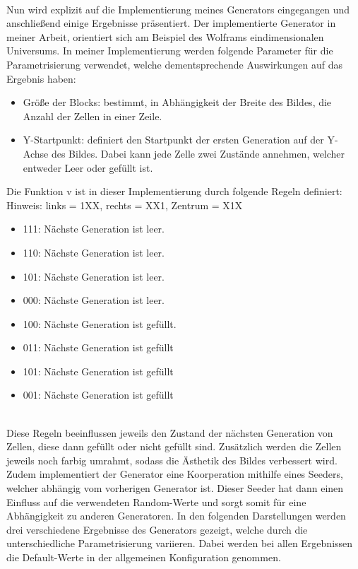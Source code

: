 \documentclass[../mciAusarbeitung.tex]{subfiles}
\begin{document}
            $~$ \\Nun wird explizit auf die Implementierung meines Generators eingegangen und anschließend einige Ergebnisse präsentiert. 
            Der implementierte Generator in meiner Arbeit, orientiert sich am Beispiel des Wolframs eindimensionalen Universums. In meiner Implementierung werden folgende Parameter für die Parametrisierung verwendet, welche dementsprechende Auswirkungen auf das Ergebnis haben:
            \begin{itemize}
            
            \item Größe der Blocks:	bestimmt, in Abhängigkeit der Breite des Bildes, die Anzahl der Zellen in einer Zeile.
            \item Y-Startpunkt:	definiert den Startpunkt der ersten Generation auf der Y-Achse des Bildes.
            Dabei kann jede Zelle zwei Zustände annehmen, welcher entweder Leer oder gefüllt ist. 
            \end{itemize}
            Die Funktion v ist in dieser Implementierung durch folgende Regeln definiert: 
            Hinweis: links = 1XX, rechts = XX1, Zentrum = X1X
            
            \begin{itemize}
 \item 111: Nächste Generation ist leer.
 \item 110: Nächste Generation ist leer.
 \item 101: Nächste Generation ist leer.
 \item 000: Nächste Generation ist leer.
 \item 100: Nächste Generation ist gefüllt.
 \item 011: Nächste Generation ist gefüllt
 \item 101: Nächste Generation ist gefüllt
  \item 001: Nächste Generation ist gefüllt
\end{itemize}

            $~$ \\Diese Regeln beeinflussen jeweils den Zustand der nächsten Generation von Zellen, diese dann gefüllt oder nicht gefüllt sind.  Zusätzlich werden die Zellen jeweils noch farbig umrahmt, sodass die Ästhetik des Bildes verbessert wird. Zudem implementiert der Generator eine Koorperation mithilfe eines Seeders, welcher abhängig vom vorherigen Generator ist. Dieser Seeder hat dann einen Einfluss auf die verwendeten Random-Werte und sorgt somit für eine Abhängigkeit zu anderen Generatoren.
            In den folgenden Darstellungen werden drei verschiedene Ergebnisse des Generators gezeigt, welche durch die unterschiedliche Parametrisierung variieren. Dabei werden bei allen Ergebnissen die Default-Werte in der allgemeinen Konfiguration genommen.
            
\end{document}
